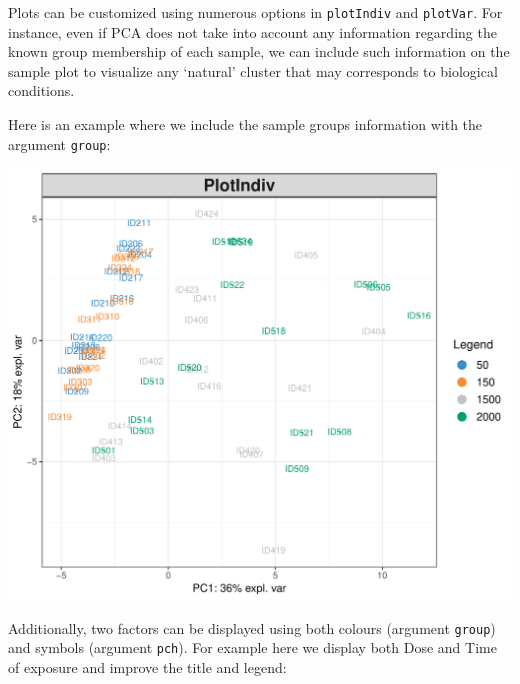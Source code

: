 \documentclass[]{book}
\newenvironment{Shaded}{\begin{snugshade}}{\end{snugshade}}
\newcommand{\DataTypeTok}[1]{\textcolor[rgb]{0.13,0.29,0.53}{#1}}
\newcommand{\KeywordTok}[1]{\textcolor[rgb]{0.13,0.29,0.53}{\textbf{#1}}}
\newcommand{\NormalTok}[1]{#1}
\newcommand{\OperatorTok}[1]{\textcolor[rgb]{0.81,0.36,0.00}{\textbf{#1}}}
\newcommand{\OtherTok}[1]{\textcolor[rgb]{0.56,0.35,0.01}{#1}}
\newcommand{\StringTok}[1]{\textcolor[rgb]{0.31,0.60,0.02}{#1}}
\begin{document}
Plots can be customized using numerous options in \texttt{plotIndiv} and \texttt{plotVar}. For instance, even if PCA does not take into account any information regarding the known group membership of each sample, we can include such information on the sample plot to visualize any `natural' cluster that may corresponds to biological conditions.

Here is an example where we include the sample groups information with the argument \texttt{group}:

\begin{Shaded}
\end{Shaded}

\begin{center}\includegraphics[width=0.5\linewidth,]{Figures/03-pca-liver-1-1} \end{center}

Additionally, two factors can be displayed using both colours (argument \texttt{group}) and symbols (argument \texttt{pch}). For example here we display both Dose and Time of exposure and improve the title and legend:

\begin{Shaded}
\end{Shaded}
\end{document}
